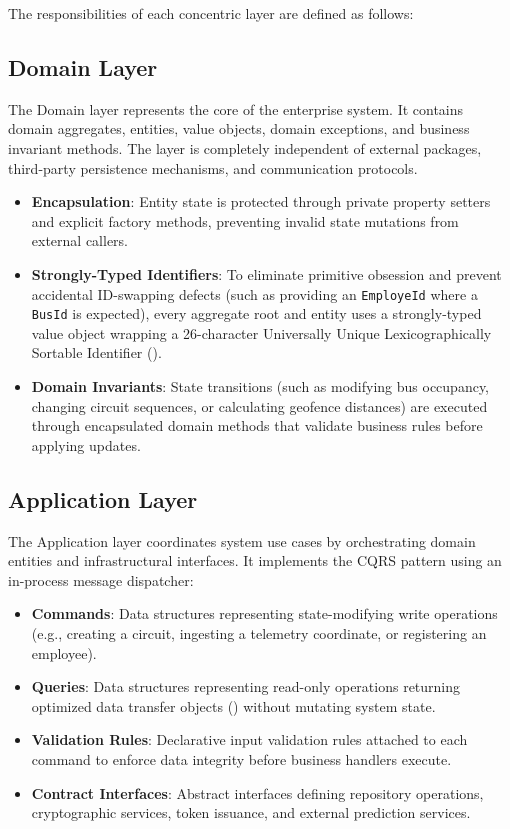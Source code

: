 The responsibilities of each concentric layer are defined as follows:

\subsection{Domain Layer}
The Domain layer represents the core of the enterprise system. It contains domain aggregates, entities, value objects, domain exceptions, and business invariant methods. The layer is completely independent of external packages, third-party persistence mechanisms, and communication protocols.
\begin{itemize}
  \item \textbf{Encapsulation}: Entity state is protected through private property setters and explicit factory methods, preventing invalid state mutations from external callers.
  \item \textbf{Strongly-Typed Identifiers}: To eliminate primitive obsession and prevent accidental ID-swapping defects (such as providing an \texttt{EmployeId} where a \texttt{BusId} is expected), every aggregate root and entity uses a strongly-typed value object wrapping a 26-character Universally Unique Lexicographically Sortable Identifier ().
  \item \textbf{Domain Invariants}: State transitions (such as modifying bus occupancy, changing circuit sequences, or calculating geofence distances) are executed through encapsulated domain methods that validate business rules before applying updates.
\end{itemize}

\subsection{Application Layer}
The Application layer coordinates system use cases by orchestrating domain entities and infrastructural interfaces. It implements the CQRS pattern using an in-process message dispatcher:
\begin{itemize}
  \item \textbf{Commands}: Data structures representing state-modifying write operations (e.g., creating a circuit, ingesting a telemetry coordinate, or registering an employee).
  \item \textbf{Queries}: Data structures representing read-only operations returning optimized data transfer objects () without mutating system state.
  \item \textbf{Validation Rules}: Declarative input validation rules attached to each command to enforce data integrity before business handlers execute.
  \item \textbf{Contract Interfaces}: Abstract interfaces defining repository operations, cryptographic services, token issuance, and external prediction services.
\end{itemize}

